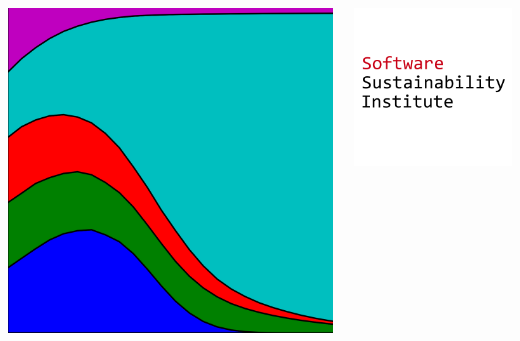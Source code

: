 \documentclass{beamer}
\begin{document}
\begin{frame}
\begin{columns}[T]
\begin{column}{.23\textwidth}
        \includegraphics[width=\textwidth]{static/axelrod-logo.png}
    \end{column}%
    \begin{column}{.23\textwidth}
        \includegraphics[width=\textwidth]{static/ssi-logo.png}


\end{column}
\end{columns}
\end{frame}
\end{document}
